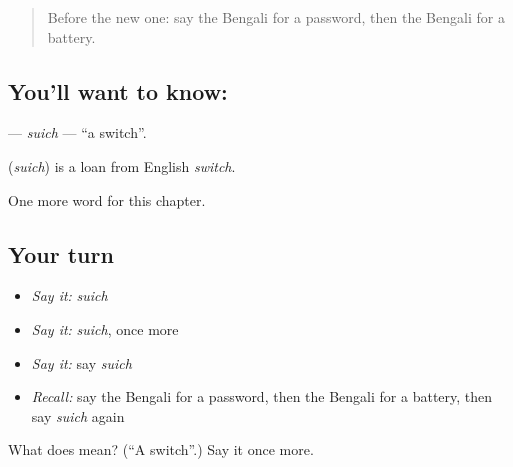 \label{lesson:BN-C258-suich}



\begin{quote}
Before the new one: say the Bengali for a password, then the Bengali for a battery.
\end{quote}

\subsection*{You'll want to know: }
\textbf{} — \emph{suich} — \textquotedblleft{}a switch\textquotedblright{}.

\begin{cousinweb}
\textbf{} (\emph{suich}) is a loan from English \emph{switch}.
\end{cousinweb}

\begin{grammarlens}[title={What you've built}]
One more word for this chapter.
\end{grammarlens}

\subsection*{Your turn}
\begin{itemize}
\raggedright
  \item \emph{Say it:} \emph{suich}
  \item \emph{Say it:} \emph{suich}, once more
  \item \emph{Say it:} say \emph{suich}
  \item \emph{Recall:} say the Bengali for a password, then the Bengali for a battery, then say \emph{suich} again
\end{itemize}

\begin{tcolorbox}[breakable,colback=teal!4,colframe=teal!35!black,title={Before you move on}]
What does  mean? (\textquotedblleft{}A switch\textquotedblright{}.) Say it once more.
\end{tcolorbox}
